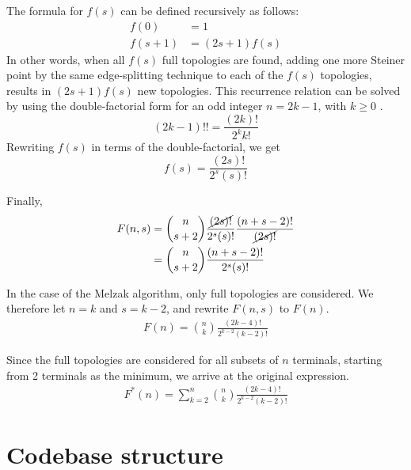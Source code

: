 \documentclass{l4proj}
\begin{document}
\begin{appendices}
    The formula for $f(s)$ can be defined recursively as follows:
    \begin{equation*}
        \begin{aligned}
            f(0)   & = 1            \\
            f(s+1) & = (2s + 1)f(s)
        \end{aligned}
    \end{equation*}
    In other words, when all $f(s)$ full topologies are found, adding one more Steiner point by the same edge-splitting technique to each of the $f(s)$ topologies, results in $(2s + 1)f(s)$ new topologies.
    This recurrence relation can be solved by using the double-factorial form for an odd integer $n = 2k - 1$, with $k \ge 0$ \citep{Double_factorial}.
    $$
        (2k - 1)!! = \frac{(2k)!}{2^k k!}
    $$
    Rewriting $f(s)$ in terms of the double-factorial, we get
    $$
        f(s) = \frac{(2s)!}{2^{s}(s)!}
    $$

    Finally,
    \begin{equation*}
        \begin{aligned}
            F(n, s) & = \binom{n}{s+2}\frac{\cancel{(2s)!}}{2^s(s)!}\frac{(n + s - 2)!}{\cancel{(2s)!}} \\
                    & = \binom{n}{s+2}\frac{(n + s - 2)!}{2^s(s)!}
        \end{aligned}
    \end{equation*}

    In the case of the Melzak algorithm, only full topologies are considered. We therefore let $n = k$ and $s = k - 2$, and rewrite $F(n, s)$ to $F(n)$.
    \begin{equation*}
        \begin{aligned}
            F(n) = \binom{n}{k}\frac{(2k - 4)!}{2^{k-2}(k-2)!}
        \end{aligned}
    \end{equation*}

    Since the full topologies are considered for all subsets of $n$ terminals, starting from 2 terminals as the minimum, we arrive at the original expression.
    \begin{equation*}
        \begin{aligned}
            F^*(n) = \sum_{k=2}^{n} \binom{n}{k}\frac{(2k - 4)!}{2^{k-2}(k-2)!}
        \end{aligned}
    \end{equation*}

    \chapter{Codebase structure}
    \label{app:repository_structure}
    



\end{appendices}




\renewcommand{\thechapter}{0}

\end{document}
